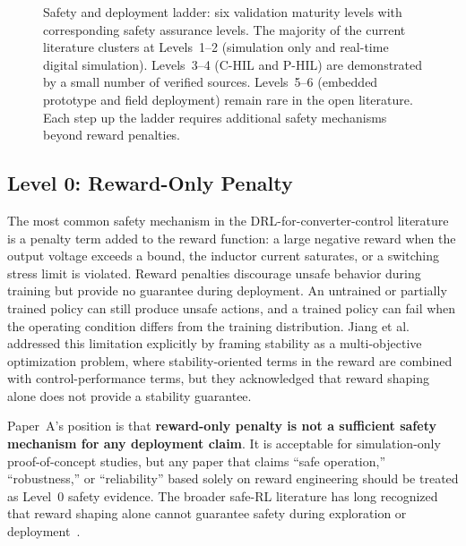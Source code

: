 \documentclass[manuscript,screen,review]{acmart}
\begin{document}
\begin{figure}[t]
\caption{Safety and deployment ladder: six validation maturity levels with corresponding safety assurance levels. The majority of the current literature clusters at Levels~1--2 (simulation only and real-time digital simulation). Levels~3--4 (C-HIL and P-HIL) are demonstrated by a small number of verified sources. Levels~5--6 (embedded prototype and field deployment) remain rare in the open literature. Each step up the ladder requires additional safety mechanisms beyond reward penalties.}
\label{fig:safety-deployment-ladder}
\end{figure}

\subsection{Level 0: Reward-Only Penalty}

The most common safety mechanism in the DRL-for-converter-control literature is a penalty term added to the reward function: a large negative reward when the output voltage exceeds a bound, the inductor current saturates, or a switching stress limit is violated.
Reward penalties discourage unsafe behavior during training but provide no guarantee during deployment.
An untrained or partially trained policy can still produce unsafe actions, and a trained policy can fail when the operating condition differs from the training distribution.
Jiang et al.~\cite{jiang2023stability} addressed this limitation explicitly by framing stability as a multi-objective optimization problem, where stability-oriented terms in the reward are combined with control-performance terms, but they acknowledged that reward shaping alone does not provide a stability guarantee.

Paper~A's position is that \textbf{reward-only penalty is not a sufficient safety mechanism for any deployment claim}.
It is acceptable for simulation-only proof-of-concept studies, but any paper that claims ``safe operation,'' ``robustness,'' or ``reliability'' based solely on reward engineering should be treated as Level~0 safety evidence.
The broader safe-RL literature has long recognized that reward shaping alone cannot guarantee safety during exploration or deployment~\cite{garcia2015comprehensive,moldovan2012safe}.
\end{document}
